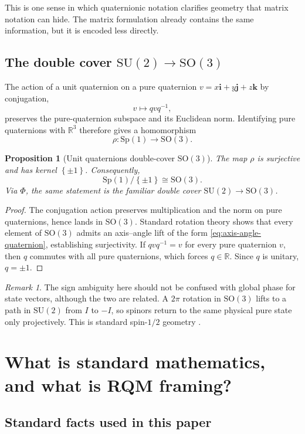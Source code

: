 \documentclass[11pt]{article}
\newtheorem{proposition}[definition]{Proposition}
\theoremstyle{remark}
\newtheorem{remark}[definition]{Remark}
\newcommand{\R}{\mathbb{R}}
\newcommand{\SU}{\mathrm{SU}}
\newcommand{\SO}{\mathrm{SO}}
\newcommand{\Sp}{\mathrm{Sp}}
\newcommand{\ii}{\mathbf{i}}
\newcommand{\jj}{\mathbf{j}}
\newcommand{\kk}{\mathbf{k}}
\newcommand{\Id}{I}
\newcommand{\set}[1]{\left\{ #1 \right\}}
\begin{document}
This is one sense in which quaternionic notation clarifies geometry that matrix notation can hide. The matrix formulation already contains the same information, but it is encoded less directly.

\subsection{The double cover \texorpdfstring{$\SU(2)\to\SO(3)$}{SU(2) to SO(3)}}

The action of a unit quaternion on a pure quaternion $v=x\ii+y\jj+z\kk$ by conjugation,
\[
v\longmapsto qvq^{-1},
\]
preserves the pure-quaternion subspace and its Euclidean norm. Identifying pure quaternions with $\R^3$ therefore gives a homomorphism
\[
\rho:\Sp(1)\to\SO(3).
\]

\begin{proposition}[Unit quaternions double-cover $\SO(3)$]
The map $\rho$ is surjective and has kernel $\set{\pm1}$. Consequently,
\[
\Sp(1)/\set{\pm1}\cong \SO(3).
\]
Via $\Phi$, the same statement is the familiar double cover $\SU(2)\to\SO(3)$.
\end{proposition}

\begin{proof}
The conjugation action preserves multiplication and the norm on pure quaternions, hence lands in $\SO(3)$. Standard rotation theory shows that every element of $\SO(3)$ admits an axis--angle lift of the form \eqref{eq:axis-angle-quaternion}, establishing surjectivity. If $qvq^{-1}=v$ for every pure quaternion $v$, then $q$ commutes with all pure quaternions, which forces $q\in\R$. Since $q$ is unitary, $q=\pm1$.
\end{proof}

\begin{remark}
The sign ambiguity here should not be confused with global phase for state vectors, although the two are related. A $2\pi$ rotation in $\SO(3)$ lifts to a path in $\SU(2)$ from $\Id$ to $-\Id$, so spinors return to the same physical pure state only projectively. This is standard spin-$1/2$ geometry \citep{penrose1984}.
\end{remark}

\section{What is standard mathematics, and what is RQM framing?}

\subsection{Standard facts used in this paper}
\end{document}
